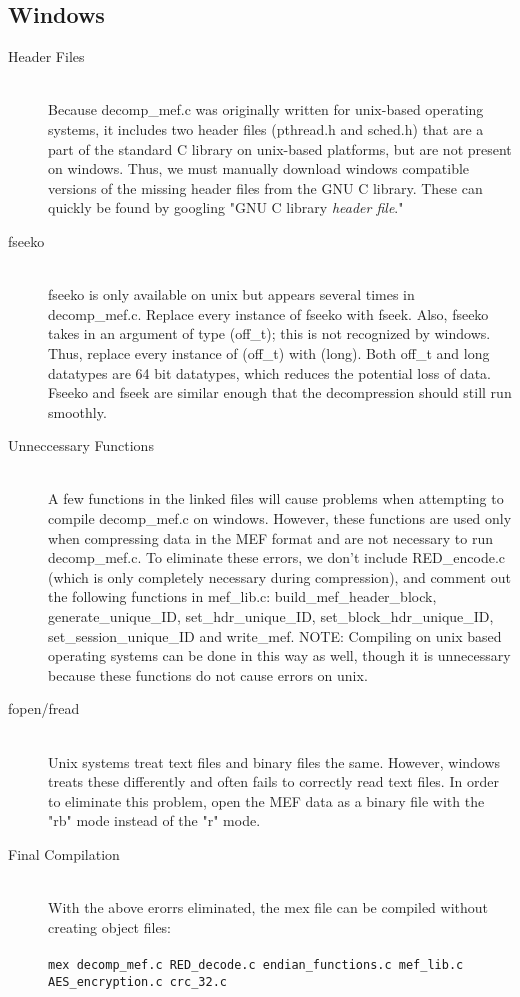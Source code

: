 \documentclass{article}
\begin{document}
\subsection{Windows}
\begin{description}
  \item[Header Files] \hfill \\
  Because decomp\_mef.c was originally written for unix-based operating systems, it includes two header files (pthread.h and sched.h) that are a part of the standard C library on unix-based platforms, but are not present on windows. Thus, we must manually download windows compatible versions of the missing header files from the GNU C library.  These can quickly be found by googling "GNU C library \emph{header file}."
  \item[fseeko] \hfill \\
  fseeko is only available on unix but appears several times in decomp\_mef.c. Replace every instance of fseeko with fseek. Also, fseeko takes in an argument of type (off\_t); this is not recognized by windows. Thus, replace every instance of (off\_t) with (long). Both off\_t and long datatypes are 64 bit datatypes, which reduces the potential loss of data. Fseeko and fseek are similar enough that the decompression should still run smoothly.
  \item[Unneccessary Functions] \hfill \\
  A few functions in the linked files will cause problems when attempting to compile decomp\_mef.c on windows. However, these functions are used only when compressing data in the MEF format and are not necessary to run decomp\_mef.c. To eliminate these errors, we don't include RED\_encode.c (which is only completely necessary during compression), and comment out the following functions in mef\_lib.c: build\_mef\_header\_block, generate\_unique\_ID, set\_hdr\_unique\_ID, set\_block\_hdr\_unique\_ID, set\_session\_unique\_ID and write\_mef. NOTE: Compiling on unix based operating systems can be done in this way as well, though it is  unnecessary because these functions do not cause errors on unix.
   \item[fopen/fread] \hfill \\
Unix systems treat text files and binary files the same. However, windows treats these differently and often fails to correctly read text files. In order to eliminate this problem, open the MEF data as a binary file with the "rb" mode instead of the "r" mode.
\item[Final Compilation] \hfill \\
With the above erorrs eliminated, the mex file can be compiled without creating object files:\\
\\
\texttt{mex decomp\_mef.c RED\_decode.c endian\_functions.c mef\_lib.c AES\_encryption.c crc\_32.c}\\
\\
\end{description}
\end{document}
